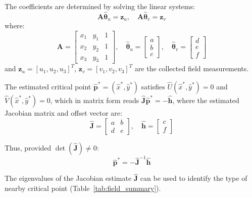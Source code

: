 \documentclass[lettersize,journal]{IEEEtran}
\begin{document}
The coefficients are determined by solving the linear systems:
\begin{equation}\label{eq:4}
\mathbf{A}\hat{\boldsymbol{\theta}}_u = \mathbf{z}_u, \quad \mathbf{A}\hat{\boldsymbol{\theta}}_v = \mathbf{z}_v
\end{equation}
where:
\begin{equation}\label{eq:5}
\mathbf{A} = \begin{bmatrix} x_1 & y_1 & 1 \\ x_2 & y_2 & 1 \\ x_3 & y_3 & 1 \end{bmatrix}, \quad \hat{\boldsymbol{\theta}}_u = \begin{bmatrix} a \\ b \\ c \end{bmatrix}, \quad \hat{\boldsymbol{\theta}}_v = \begin{bmatrix} d \\ e \\ f \end{bmatrix}
\end{equation}
and $\mathbf{z}_u = [u_1, u_2, u_3]^T$, $\mathbf{z}_v = [v_1, v_2, v_3]^T$ are the collected field measurements.

The estimated critical point $\hat{\mathbf{p}}^* = (\hat{x}^*, \hat{y}^*)$ satisfies $\hat{U}(\hat{x}^*, \hat{y}^*) = 0$ and $\hat{V}(\hat{x}^*, \hat{y}^*) = 0$, which in matrix form reads $\hat{\mathbf{J}}\hat{\mathbf{p}}^* = -\hat{\mathbf{h}}$, where the estimated Jacobian matrix and offset vector are:
\begin{equation}\label{eq:8}
\hat{\mathbf{J}} = \begin{bmatrix} a & b \\ d & e \end{bmatrix}, \quad \hat{\mathbf{h}} = \begin{bmatrix} c \\ f \end{bmatrix}
\end{equation}

Thus, provided $\det(\hat{\mathbf{J}}) \neq 0$:
\begin{equation}\label{eq:9}
\hat{\mathbf{p}}^* = -\hat{\mathbf{J}}^{-1}\hat{\mathbf{h}}
\end{equation}

The eigenvalues of the Jacobian estimate $\hat{\mathbf{J}}$ can be used to identify the type of nearby critical point (Table~\ref{tab:field_summary}).
\end{document}
